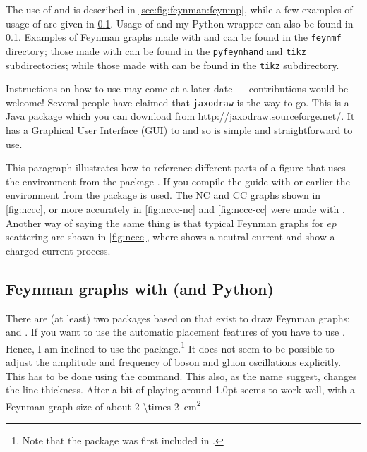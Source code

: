 The use of  and  is
described in \cref{sec:fig:feynman:feynmp}, while a few
examples of usage of \Package{\TikZ} are given in
\cref{sec:fig:feynman:tikz}.
Usage of  and my Python wrapper 
can also be found in \cref{sec:fig:feynman:tikz}.
Examples of Feynman graphs made
with  and  can be found in the \texttt{feynmf} directory;
those made with  can be found in the \texttt{pyfeynhand} and \texttt{tikz} subdirectories;
while those made with \Package{\TikZ} can be found in the \texttt{tikz} subdirectory.

Instructions on how to use  may come at a later
date --- contributions would be welcome! Several people have claimed
that \texttt{jaxodraw} is the way to go. This is a Java package which
you can download from \url{http://jaxodraw.sourceforge.net/}. It has
a Graphical User Interface (GUI) to  and so is simple and
straightforward to use.

This paragraph illustrates how to reference different parts of a
figure that uses the environment  from the package .
If you compile the guide with  or earlier the
environment  from the package  is used.
The NC and CC graphs shown in
\cref{fig:nccc}, or more accurately in \cref{fig:nccc-nc} and
\cref{fig:nccc-cc} were made with . Another way of
saying the same thing is that typical Feynman graphs for \(ep\)
scattering are shown in \cref{fig:nccc}, where
 shows a neutral current and 
show a charged current process.


\subsection{Feynman graphs with \TikZ (and Python)}%
\label{sec:fig:feynman:tikz}

There are (at least) two packages based on \TikZ that exist to draw Feynman graphs:
 and .
If you want to use the automatic placement features of 
you have to use \LuaLaTeX.
Hence, I am inclined to use the  package.\footnote{%
Note that the  package was first included in .}
It does not seem to be possible to adjust the amplitude and frequency
of boson and gluon oscillations explicitly.
This has to be done using the  command.
This also, as the name suggest, changes the line thickness.
After a bit of playing around \num{1.0}{pt} seems to work well,
with a Feynman graph size of about \SI[parse-numbers=false]{2 \times 2}{\cm^{2}}


